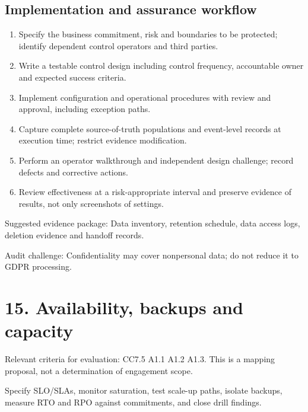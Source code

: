 \documentclass[10pt,oneside]{report}
\begin{document}
\subsection{Implementation and assurance workflow}
\begin{enumerate}
\item Specify the business commitment, risk and boundaries to be protected; identify dependent control operators and third parties.
\item Write a testable control design including control frequency, accountable owner and expected success criteria.
\item Implement configuration and operational procedures with review and approval, including exception paths.
\item Capture complete source-of-truth populations and event-level records at execution time; restrict evidence modification.
\item Perform an operator walkthrough and independent design challenge; record defects and corrective actions.
\item Review effectiveness at a risk-appropriate interval and preserve evidence of results, not only screenshots of settings.
\end{enumerate}

Suggested evidence package: Data inventory, retention schedule, data access logs, deletion evidence and handoff records.

Audit challenge: Confidentiality may cover nonpersonal data; do not reduce it to GDPR processing.

\section{15. Availability, backups and capacity}
Relevant criteria for evaluation: CC7.5 A1.1 A1.2 A1.3. This is a mapping proposal, not a determination of engagement scope.

\begin{engineeringbox}
Specify SLO/SLAs, monitor saturation, test scale-up paths, isolate backups, measure RTO and RPO against commitments, and close drill findings.
\end{engineeringbox}
\end{document}
